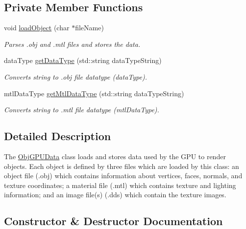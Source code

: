 \subsection*{Private Member Functions}
\begin{DoxyCompactItemize}
\item 
void \hyperlink{class_obj_g_p_u_data_a5926e9755a614029b893f3ffa6147b43}{load\+Object} (char $\ast$file\+Name)
\begin{DoxyCompactList}\small\item\em Parses .obj and .mtl files and stores the data. \end{DoxyCompactList}\item 
data\+Type \hyperlink{class_obj_g_p_u_data_a9a006c8f431ffc2ee676e10a3cd0fe44}{get\+Data\+Type} (std\+::string data\+Type\+String)
\begin{DoxyCompactList}\small\item\em Converts string to .obj file datatype (data\+Type). \end{DoxyCompactList}\item 
mtl\+Data\+Type \hyperlink{class_obj_g_p_u_data_a3be542ac0e0ed9f7f34db0eae7346e49}{get\+Mtl\+Data\+Type} (std\+::string data\+Type\+String)
\begin{DoxyCompactList}\small\item\em Converts string to .mtl file datatype (mtl\+Data\+Type). \end{DoxyCompactList}\end{DoxyCompactItemize}


\subsection{Detailed Description}
The \hyperlink{class_obj_g_p_u_data}{Obj\+G\+P\+U\+Data} class loads and stores data used by the G\+PU to render objects. Each object is defined by three files which are loaded by this class\+: an object file (.obj) which contains information about vertices, faces, normals, and texture coordinates; a material file (.mtl) which contains texture and lighting information; and an image file(s) (.dds) which contain the texture images. 

\subsection{Constructor \& Destructor Documentation}
